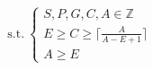 \documentclass[preview]{standalone}
\begin{document}
\begin{align*}
\text{s.t.}~\begin{cases} S, P, G, C, A \in \mathbb{Z} \\ E \geq C \geq \lceil \frac{A}{A - E + 1} \rceil \\ A \geq E \end{cases}
\end{align*}
\end{document}
